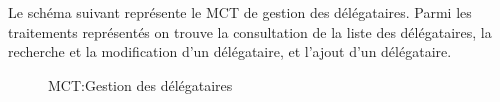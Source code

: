 \documentclass[a4paper]{report}
\begin{document}
\begin{doublespace}
	Le schéma suivant représente le MCT de gestion des délégataires. Parmi les traitements représentés
	on trouve la consultation de la liste des délégataires, la recherche et la modification d'un délégataire,
	et l'ajout d'un délégataire.
	\begin{figure}[H]
		\begin{center}
			\caption{MCT:Gestion des délégataires}
		\end{center}
	\end{figure}


\end{doublespace}
\end{document}
